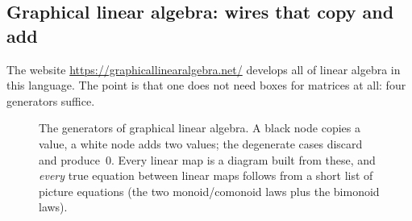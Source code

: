\subsection{Graphical linear algebra: wires that copy and add}

The website \url{https://graphicallinearalgebra.net/} develops all of linear algebra in
this language. The point is that one does not need boxes for matrices at all: four
generators suffice.

\begin{figure}[H]
\centering
{}
\caption{The generators of graphical linear algebra. A black node copies a value, a white
node adds two values; the degenerate cases discard and produce~$0$. Every linear map is a
diagram built from these, and \emph{every} true equation between linear maps follows from
a short list of picture equations (the two monoid/comonoid laws plus the bimonoid laws).}
\label{fig:glagens}
\end{figure}

